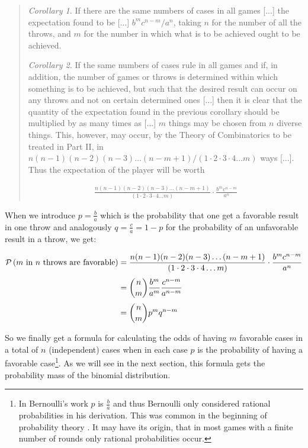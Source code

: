 \begin{quotation}
  \emph{Corollary 1.} If there are the same numbers of cases in all games [...] the expectation found to be [...] $b^mc^{n-m}/a^n$, taking $n$ for the number of all the throws, and $m$ for the number in which what is to be achieved ought to be achieved.
  
  \emph{Corollary 2.} If the same numbers of cases rule in all games and if, in addition, the number of games or throws is determined within which something is to be achieved, but such that the desired result can occur on any throws and not on certain determined ones [...] then it is clear that the quantity of the expectation found in the previous corollary should be multiplied by as many times as [...] $m$ things may be chosen from $n$ diverse things. This, however, may occur, by the Theory of Combinatorics to be treated in Part II, in $n(n-1)(n-2)(n-3)\ldots(n-m+1)/(1\cdot 2\cdot 3\cdot 4\ldots m)$ ways [...]. Thus the expectation of the player will be worth

  \begin{align*}
    \frac{n(n-1)(n-2)(n-3)\ldots(n-m+1)}{(1\cdot 2\cdot 3\cdot 4\ldots m)}\cdot \frac{b^mc^{n-m}}{a^n}
  \end{align*}
\end{quotation}

When we introduce $p=\tfrac ba$ which is the probability that one get a favorable result in one throw and analogously $q=\tfrac ca=1-p$ for the probability of an unfavorable result in a throw, we get:

\begin{align}
  \P{\text{$m$ in $n$ throws are favorable}} & = \frac{n(n-1)(n-2)(n-3)\ldots(n-m+1)}{(1\cdot 2\cdot 3\cdot 4\ldots m)}\cdot \frac{b^mc^{n-m}}{a^n} \nl
  &= \binom nm \frac{b^m}{a^m} \frac{c^{n-m}}{a^{n-m}} \nl
  &= \binom nm p^m q^{n-m}
\end{align}

So we finally get a formula for calculating the odds of having $m$ favorable cases in a total of $n$ (independent) cases when in each case $p$ is the probability of having a favorable case\footnote{In Bernoulli's work $p$ is $\tfrac ba$ and thus Bernoulli only considered rational probabilities in his derivation. This was common in the beginning of probability theory . It may have its origin, that in most games with a finite number of rounds only rational probabilities occur.}. As we will see in the next section, this formula gets the probability mass of the binomial distribution.


